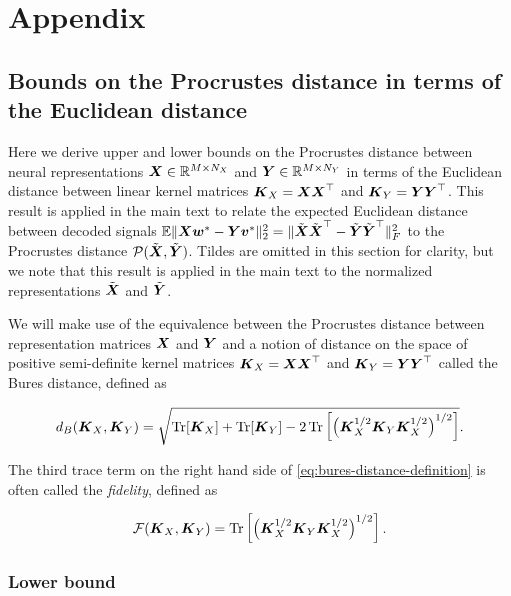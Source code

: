 \appendix

\section{Appendix}
\label{appendix}


\subsection{Bounds on the Procrustes distance in terms of the Euclidean distance}\label{appendix:bounds}

Here we derive upper and lower bounds on the Procrustes distance between neural representations $\boldsymbol{X} \in \mathbb{R}^{M \times N_X}$ and $\boldsymbol{Y} \in \mathbb{R}^{M \times N_Y}$ in terms of the Euclidean distance between linear kernel matrices $\boldsymbol{K}_X = \boldsymbol{X} \boldsymbol{X}^\top$ and $\boldsymbol{K}_Y = \boldsymbol{Y} \boldsymbol{Y}^\top$. 
This result is applied in the main text to relate the expected Euclidean distance between decoded signals $\mathbb{E} \Vert \boldsymbol{X} \boldsymbol{w}^* - \boldsymbol{Y} \boldsymbol{v}^* \Vert^2_2 = \Vert \tilde{\boldsymbol{X}} \tilde{\boldsymbol{X}}^\top - \tilde{\boldsymbol{Y}} \tilde{\boldsymbol{Y}}^\top  \Vert_F^2$ to the Procrustes distance $\mathcal{P} (\tilde{\boldsymbol{X}}, \tilde{\boldsymbol{Y}})$.
Tildes are omitted in this section for clarity, but we note that this result is applied in the main text to the normalized representations $\tilde{\boldsymbol{X}}$ and $\tilde{\boldsymbol{Y}}$.

We will make use of the equivalence between the Procrustes distance between representation matrices $\boldsymbol{X}$ and $\boldsymbol{Y}$ and a notion of distance on the space of positive semi-definite kernel matrices $\boldsymbol{K}_X = \boldsymbol{X} \boldsymbol{X}^\top$ and $\boldsymbol{K}_Y = \boldsymbol{Y} \boldsymbol{Y}^\top$ called the Bures distance, defined as 

\begin{equation}
\label{eq:bures-distance-definition}
d_B(\boldsymbol{K}_X, \boldsymbol{K}_Y) = \sqrt{\operatorname*{Tr}[\boldsymbol{K}_X] + \operatorname*{Tr}[\boldsymbol{K}_Y] - 2 \operatorname*{Tr} \left [ \left (\boldsymbol{K}_X^{1/2} \boldsymbol{K}_Y \boldsymbol{K}_X^{1/2} \right )^{1/2} \right] } .
\end{equation}

The third trace term on the right hand side of \cref{eq:bures-distance-definition} is often called the \emph{fidelity}, defined as 

\begin{equation}
 \mathcal{F}(\boldsymbol{K}_X, \boldsymbol{K}_Y) = \operatorname*{Tr} \left [ \left (\boldsymbol{K}_X^{1/2} \boldsymbol{K}_Y \boldsymbol{K}_X^{1/2} \right )^{1/2} \right].
\end{equation}



\subsubsection{Lower bound}

